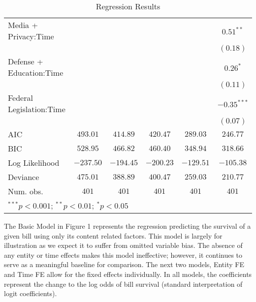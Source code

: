 \documentclass{article}
\begin{document}
\begin{table}[H]
\begin{center}
\begin{tabular}{l c c c c c}
Media + Privacy:Time     &              &               &               &               & $0.51^{**}$   \\
                                                  &              &               &               &               & $(0.18)$      \\
Defense + Education:Time &              &               &               &               & $0.26^{*}$    \\
                                                  &              &               &               &               & $(0.11)$      \\
Federal Legislation:Time &              &               &               &               & $-0.35^{***}$ \\
                                                  &              &               &               &               & $(0.07)$      \\
\hline
AIC                                               & $493.01$     & $414.89$      & $420.47$      & $289.03$      & $246.77$      \\
BIC                                               & $528.95$     & $466.82$      & $460.40$      & $348.94$      & $318.66$      \\
Log Likelihood                                    & $-237.50$    & $-194.45$     & $-200.23$     & $-129.51$     & $-105.38$     \\
Deviance                                          & $475.01$     & $388.89$      & $400.47$      & $259.03$      & $210.77$      \\
Num. obs.                                         & $401$        & $401$         & $401$         & $401$         & $401$         \\
\hline
\multicolumn{6}{l}{\scriptsize{$^{***}p<0.001$; $^{**}p<0.01$; $^{*}p<0.05$}}
\end{tabular}
\caption{Regression Results}
\label{table:coefficients}
\end{center}
\end{table}


The Basic Model in Figure 1 represents the regression predicting the survival of a given bill using only its content related factors. This model is largely for illustration as we expect it to suffer from omitted variable bias. The absence of any entity or time effects makes this model ineffective; however, it continues to serve as a meaningful baseline for comparison. The next two models, Entity FE and Time FE allow for the fixed effects individually. In all models, the coefficients represent the change to the log odds of bill survival (standard interpretation of logit coefficients). 
\end{document}
